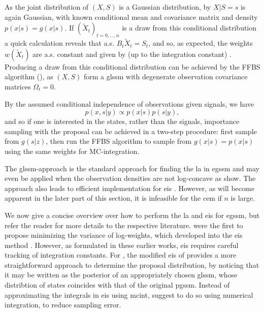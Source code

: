 As the joint distribution of $(X, S)$ is a Gaussian distribution, by  $X|S = s$ is again Gaussian,
with known conditional mean and covariance matrix and density $p(x|s) = g(x|s)$. If $(\tilde X_{t})_{t=0,\dots,n}$ is a draw from this conditional distribution a quick calculation reveals that a.s. $B_{t} \tilde X_{t} = S_{t}$, and so, as expected, the weights $w(\tilde X_{t})$ are a.s. constant and given by (up to the integration constant) . Producing a draw from this conditional distribution can be achieved by the FFBS algorithm (), as $(X, S)$ form a \gls{glssm} with degenerate observation covariance matrices $\Omega_{t} = 0$.

By the assumed conditional independence of observations given signals, we have
$$
p(x, s|y) \propto p(x|s) p(s|y),
$$
and so if one is interested in the states, rather than the signals, importance sampling with the proposal  can be achieved in a two-step procedure: first sample from $g(s|z)$, then run the FFBS algorithm to sample from $g(x|s) = p(x|s)$ using the same weights for MC-integration. 

The \gls{glssm}-approach is the standard approach for finding the \gls{la} in \gls{egssm} \citep{Durbin1997Monte,Durbin2012Time} and may even be applied when the observation densities are not log-concave as \citep{Jungbacker2007Monte} show. The approach also leads to efficient implementation for \gls{eis} \citep{Koopman2019Modified}. However, as will become apparent in the later part of this section, it is infeasible for the \gls{cem} if $n$ is large. 

We now give a concise overview over how to perform the \gls{la} and \gls{eis} for \gls{egssm}, but refer the reader for more details to the respective literature.
\citep{Danielsson1993Accelerateda} were the first to propose minimizing the variance of log-weights, which developed into the \acrshort{eis} method \citep{Liesenfeld2003Univariate, Richard2007Efficient}. However, as formulated in these earlier works, \acrshort{eis} requires careful tracking of integration constants.  For , the modified \acrshort{eis} of \citep{Koopman2019Modified} provides a more straightforward approach to determine the proposal distribution, by noticing that it may be written as the posterior of an appropriately chosen \acrshort{glssm}, whose distribtion of states coincides with that of the original \acrshort{pgssm}. Instead of approximating the integrals in \acrshort{eis} using \acrshort{mcint}, \citep{Koopman2015Numerically} suggest to do so using numerical integration, to reduce sampling error.

